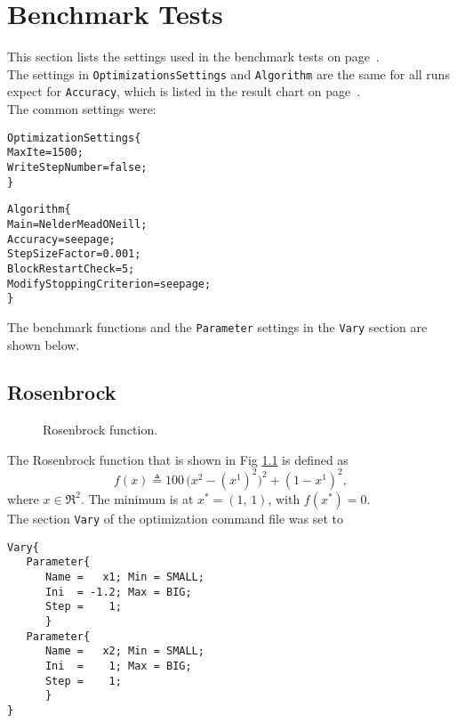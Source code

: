 \appendix

\chapter{Benchmark Tests}
This section lists the settings used in the benchmark tests 
on page~\pageref{sec:algSimBenTes}.\\

The settings in \texttt{OptimizationsSettings} and \texttt{Algorithm} 
are the same for all runs expect for \texttt{Accuracy},
which is listed in the result chart on page~\pageref{tab:nelMeaBenMarRes}.\\

\noindent The common settings were:
\begin{alltt}
OptimizationSettings\{
    MaxIte          = 1500;
    WriteStepNumber = false;
\}

Algorithm\{
   Main = NelderMeadONeill;
   Accuracy = {\rm{} see page \pageref{tab:nelMeaBenMarRes}};
   StepSizeFactor = 0.001;
   BlockRestartCheck = 5;
   ModifyStoppingCriterion  = {\rm{} see page \pageref{tab:nelMeaBenMarRes}};
\}
\end{alltt}
The benchmark functions and the \texttt{Parameter} settings in the \texttt{Vary} section are shown below.

\section{Rosenbrock}
\begin{figure}
\centering
{}
\caption{Rosenbrock function.}
\label{fig:funRosBro}
\end{figure}

The Rosenbrock function that is shown in Fig \ref{fig:funRosBro} is defined as
\begin{equation}
   f(x) \triangleq 100 \, \bigl(x^2 - (x^1)^2\bigr)^2 + (1 - x^1)^2,
\end{equation}
where $x \in \Re^2$.
The minimum is at $x^* = (1, \, 1)$, with $f(x^*) = 0$.\\

\pagebreak[3]
\noindent The section \texttt{Vary} of the optimization command file was set to
\begin{lstlisting}
Vary{
   Parameter{
      Name =   x1; Min = SMALL; 
      Ini  = -1.2; Max = BIG; 
      Step =    1;
      }
   Parameter{
      Name =   x2; Min = SMALL;
      Ini  =    1; Max = BIG;
      Step =    1;
      }
}
\end{lstlisting}
